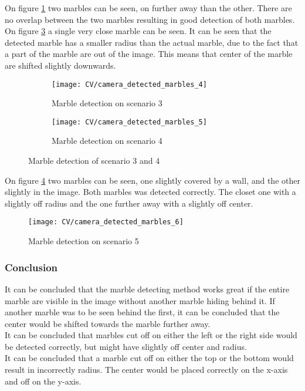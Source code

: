 \documentclass[../Head/Main.tex]{subfiles}
\begin{document}
On figure \ref{fig:md_3} two marbles can be seen, on further away than the other. There are no overlap between the two marbles resulting in good detection of both marbles.\\
On figure \ref{fig:md_4} a single very close marble can be seen. It can be seen that the detected marble has a smaller radius than the actual marble, due to the fact that a part of the marble are out of the image. This means that center of the marble are shifted slightly downwards.
\begin{figure}[H]
	\centering
	\begin{subfigure}[b]{0.45\textwidth}
		\centering
		\texttt{[image: CV/camera\_detected\_marbles\_4]}
		\caption{Marble detection on scenario 3}
		\label{fig:md_3}
	\end{subfigure}
	\hfill
	\begin{subfigure}[b]{0.45\textwidth}
		\centering
		\texttt{[image: CV/camera\_detected\_marbles\_5]}
		\caption{Marble detection on scenario 4}
		\label{fig:md_4}
	\end{subfigure}
	\caption{Marble detection of scenario 3 and 4}
\end{figure}

On figure \ref{fig:md_5} two marbles can be seen, one slightly covered by a wall, and the other slightly in the image. Both marbles was detected correctly. The closet one with a slightly off radius and the one further away with a slightly off center. 
\begin{figure}[H]
	\centering
	\texttt{[image: CV/camera\_detected\_marbles\_6]}
	\caption{Marble detection on scenario 5}
	\label{fig:md_5}
\end{figure}

\subsubsection{Conclusion}
It can be concluded that the marble detecting method works great if the entire marble are visible in the image without another marble hiding behind it. If another marble was to be seen behind the first, it can be concluded that the center would be shifted towards the marble further away. \\
It can be concluded that marbles cut off on either the left or the right side would be detected correctly, but might have slightly off center and radius.\\
It can be concluded that a marble cut off on either the top or the bottom would result in incorrectly  radius. The center would be placed correctly on the x-axis and off on the y-axis. 
\end{document}
